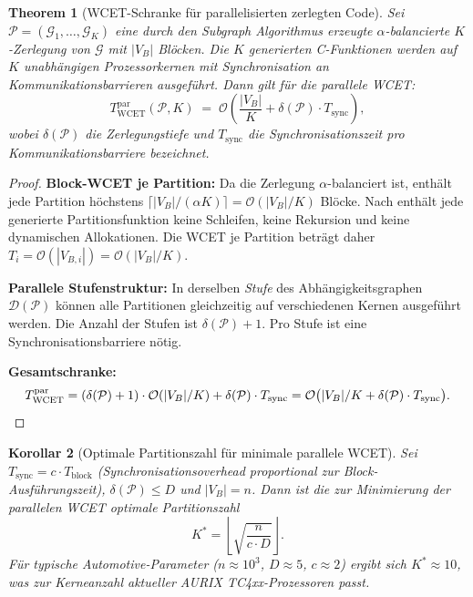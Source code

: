 ﻿\documentclass[12pt,a4paper]{article}
\newtheorem{theorem}{Theorem}[section]
\newtheorem{korollar}[theorem]{Korollar}
\theoremstyle{definition}
\begin{document}
\begin{theorem}[WCET-Schranke für parallelisierten zerlegten Code]
\label{thm:subgraph-wcet}
Sei $\mathcal{P} = (\mathcal{G}_1, \ldots, \mathcal{G}_K)$ eine durch den
Subgraph Algorithmus erzeugte $\alpha$-balancierte $K$-Zerlegung von
$\mathcal{G}$ mit $|V_B|$ Blöcken. Die $K$ generierten C-Funktionen
werden auf $K$ unabhängigen Prozessorkernen mit Synchronisation an
Kommunikationsbarrieren ausgeführt. Dann gilt für die parallele WCET:
\[
  T_{\mathrm{WCET}}^{\mathrm{par}}(\mathcal{P}, K)
  \;=\; \mathcal{O}\!\left(
    \frac{|V_B|}{K} + \delta(\mathcal{P}) \cdot T_{\mathrm{sync}}
  \right),
\]
wobei $\delta(\mathcal{P})$ die Zerlegungstiefe und $T_{\mathrm{sync}}$
die Synchronisationszeit pro Kommunikationsbarriere bezeichnet.
\end{theorem}

\begin{proof}
\textbf{Block-WCET je Partition:}
Da die Zerlegung $\alpha$-balanciert ist, enthält jede Partition höchstens
$\lceil |V_B| / (\alpha K) \rceil = \mathcal{O}(|V_B|/K)$ Blöcke.
Nach  enthält jede generierte Partitionsfunktion keine
Schleifen, keine Rekursion und keine dynamischen Allokationen.
Die WCET je Partition beträgt daher
$T_i = \mathcal{O}(|V_{B,i}|) = \mathcal{O}(|V_B|/K)$.

\textbf{Parallele Stufenstruktur:}
In derselben \emph{Stufe} des Abhängigkeitsgraphen $\mathcal{D}(\mathcal{P})$
können alle Partitionen gleichzeitig auf verschiedenen Kernen ausgeführt
werden. Die Anzahl der Stufen ist $\delta(\mathcal{P}) + 1$.
Pro Stufe ist eine Synchronisationsbarriere nötig.

\textbf{Gesamtschranke:}
\[
  T_{\mathrm{WCET}}^{\mathrm{par}}
  = (\delta(\mathcal{P}) + 1) \cdot \mathcal{O}(|V_B|/K)
    + \delta(\mathcal{P}) \cdot T_{\mathrm{sync}}
  = \mathcal{O}\bigl(|V_B|/K + \delta(\mathcal{P}) \cdot T_{\mathrm{sync}}\bigr).
  \qedhere
\]
\end{proof}

\begin{korollar}[Optimale Partitionszahl für minimale parallele WCET]
\label{kor:optimal-K}
Sei $T_{\mathrm{sync}} = c \cdot T_{\mathrm{block}}$
(Synchronisationsoverhead proportional zur Block-Ausführungszeit),
$\delta(\mathcal{P}) \leq D$ und $|V_B| = n$. Dann ist die zur
Minimierung der parallelen WCET optimale Partitionszahl
\[
  K^* = \left\lfloor\sqrt{\frac{n}{c \cdot D}}\right\rfloor.
\]
Für typische Automotive-Parameter ($n \approx 10^3$, $D \approx 5$,
$c \approx 2$) ergibt sich $K^* \approx 10$, was zur Kerneanzahl
aktueller AURIX TC4xx-Prozessoren passt.
\end{korollar}
\end{document}
